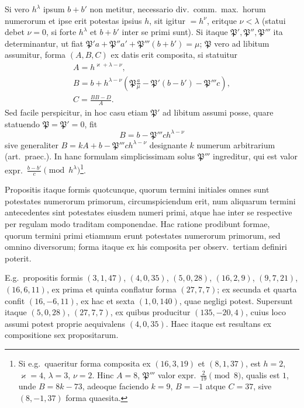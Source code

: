 \documentclass[12pt,a4paper]{article}
\theoremstyle{plain}
\theoremstyle{definition}
\theoremstyle{remark}
\theoremstyle{problemstyle}
\begin{document}
\begin{enumerate}[label=\arabic*)]
Si vero $h^\lambda$ ipsum $b + b'$ non metitur, necessario div.\ comm.\ max.\ horum numerorum et ipse erit potestas ipsius $h$, sit igitur $= h^\nu$, eritque $\nu < \lambda$ (statui debet $\nu = 0$, si forte $h^\lambda$ et $b + b'$ inter se primi sunt). Si itaque $\mathfrak{P}', \mathfrak{P}'', \mathfrak{P}'''$ ita determinantur, ut fiat $\mathfrak{P}'a + \mathfrak{P}''a' + \mathfrak{P}'''(b + b') = \mu$; $\mathfrak{P}$ vero ad libitum assumitur, forma $(A, B, C)$ ex datis erit composita, si statuitur
\begin{gather*}
A = h^{\varkappa + \lambda - \nu}, \\
B = b + h^{\lambda - \nu}(\mathfrak{P}\tfrac{a}{\mu} - \mathfrak{P}'(b - b') - \mathfrak{P}'''c), \\
C = \frac{BB - D}{A}.
\end{gather*}
Sed facile perspicitur, in hoc casu etiam $\mathfrak{P}'$ ad libitum assumi posse, quare statuendo $\mathfrak{P} = \mathfrak{P}' = 0$, fit
\[
B = b - \mathfrak{P}'''ch^{\lambda - \nu}
\]
sive generaliter $B = kA + b - \mathfrak{P}'''ch^{\lambda - \nu}$ designante $k$ numerum arbitrarium (art.\ praec.). In hanc formulam simplicissimam solus $\mathfrak{P}'''$ ingreditur, qui est valor expr.\ $\frac{b - b'}{c} \pmod{h^\lambda}$\footnote{Si e.g.\ quaeritur forma composita ex $(16, 3, 19)$ et $(8, 1, 37)$, est $h = 2$, $\varkappa = 4$, $\lambda = 3$, $\nu = 2$. Hinc $A = 8$, $\mathfrak{P}'''$ valor expr.\ $\frac{2}{19} \pmod{8}$, qualis est $1$, unde $B = 8k - 73$, adeoque faciendo $k = 9$, $B = -1$ atque $C = 37$, sive $(8, -1, 37)$ forma quaesita.}.
\end{enumerate}

Propositis itaque formis quotcunque, quorum termini initiales omnes sunt potestates numerorum primorum, circumspiciendum erit, num aliquarum termini antecedentes sint potestates eiusdem numeri primi, atque hae inter se respective per regulam modo traditam componendae. Hac ratione prodibunt formae, quorum termini primi etiamnum erunt potestates numerorum primorum, sed omnino diversorum; forma itaque ex his composita per observ.\ tertiam definiri poterit.

E.g.\ propositis formis $(3, 1, 47)$, $(4, 0, 35)$, $(5, 0, 28)$, $(16, 2, 9)$, $(9, 7, 21)$, $(16, 6, 11)$, ex prima et quinta conflatur forma $(27, 7, 7)$; ex secunda et quarta confit $(16, -6, 11)$, ex hac et sexta $(1, 0, 140)$, quae negligi potest. Supersunt itaque $(5, 0, 28)$, $(27, 7, 7)$, ex quibus producitur $(135, -20, 4)$, cuius loco assumi potest proprie aequivalens $(4, 0, 35)$. Haec itaque est resultans ex compositione sex propositarum.
\end{document}

